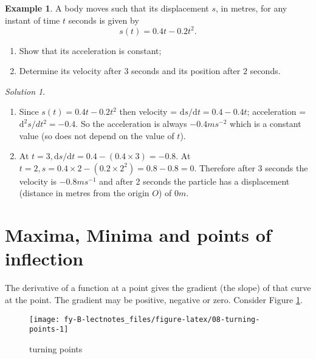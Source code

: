 \documentclass[
  11pt,
  oneside]{book}
\providecommand{\tightlist}{%
  \setlength{\itemsep}{0pt}\setlength{\parskip}{0pt}}
\newcommand{\slide}{}
\theoremstyle{definition}
\theoremstyle{definition}
\newtheorem{example}{Example}[chapter]
\theoremstyle{definition}
\theoremstyle{definition}
\theoremstyle{remark}
\newtheorem*{solution}{Solution}
\begin{document}
\begin{example}

A body moves such that its displacement \(s\), in metres, for any instant of time \(t\) seconds is given by
\[
s(t) = 0.4t-0.2t^2.
\]

\begin{enumerate}
\def\labelenumi{\arabic{enumi}.}
\tightlist
\item
  Show that its acceleration is constant;
\item
  Determine its velocity after \(3\) seconds and its position after \(2\) seconds.
\end{enumerate}

\end{example}

\begin{solution}
\leavevmode

\begin{enumerate}
\def\labelenumi{\arabic{enumi}.}
\item
  Since \(s(t) = 0.4t-0.2t^2\) then velocity = \(\mathrm{d} s/\mathrm{d} t = 0.4-0.4t\); acceleration = \(\mathrm{d}^{2}s/dt^2 = -0.4\).
  So the acceleration is always \(-0.4ms^{-2}\) which is a constant value (so does not depend on the value of \(t\)).
\item
  At \(t=3, \mathrm{d} s/\mathrm{d} t = 0.4-(0.4\times 3) = -0.8\). At \(t=2, s = 0.4\times2-(0.2\times 2^2) = 0.8-0.8 = 0\). Therefore after \(3\) seconds the velocity is \(-0.8ms^{-1}\) and after 2 seconds the particle has a displacement (distance in metres from the origin \(O\)) of \(0m\).
\end{enumerate}

\end{solution}

\slide

\section{Maxima, Minima and points of inflection}\label{lecture-eight}

The derivative of a function at a point gives the gradient (the slope) of that curve at the point. The gradient may be positive, negative or zero. Consider Figure \ref{fig:08-turning-points}.

\begin{figure}

{\centering \texttt{[image: fy-B-lectnotes\_files/figure-latex/08-turning-points-1]} 

}

\caption{turning points}\label{fig:08-turning-points}
\end{figure}
\end{document}
